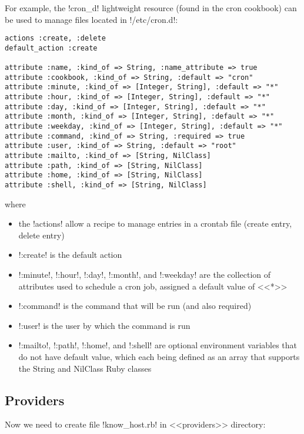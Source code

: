For example, the \inline!cron_d! lightweight resource (found in the cron cookbook) can be used to manage files located in \inline!/etc/cron.d!:

\begin{lstlisting}[label=lst:cookbook-lwrp3]
actions :create, :delete
default_action :create

attribute :name, :kind_of => String, :name_attribute => true
attribute :cookbook, :kind_of => String, :default => "cron"
attribute :minute, :kind_of => [Integer, String], :default => "*"
attribute :hour, :kind_of => [Integer, String], :default => "*"
attribute :day, :kind_of => [Integer, String], :default => "*"
attribute :month, :kind_of => [Integer, String], :default => "*"
attribute :weekday, :kind_of => [Integer, String], :default => "*"
attribute :command, :kind_of => String, :required => true
attribute :user, :kind_of => String, :default => "root"
attribute :mailto, :kind_of => [String, NilClass]
attribute :path, :kind_of => [String, NilClass]
attribute :home, :kind_of => [String, NilClass]
attribute :shell, :kind_of => [String, NilClass]
\end{lstlisting}

where

\begin{itemize}
  \item the \inline!actions! allow a recipe to manage entries in a crontab file (create entry, delete entry)
  \item \inline!:create! is the default action
  \item \inline!:minute!, \inline!:hour!, \inline!:day!, \inline!:month!, and \inline!:weekday! are the collection of attributes used to schedule a cron job, assigned a default value of <<*>>
  \item \inline!:command! is the command that will be run (and also required)
  \item \inline!:user! is the user by which the command is run
  \item \inline!:mailto!, \inline!:path!, \inline!:home!, and \inline!:shell! are optional environment variables that do not have default value, which each being defined as an array that supports the String and NilClass Ruby classes
\end{itemize}

\subsection{Providers}

Now we need to create file \inline!know_host.rb! in <<providers>> directory:

